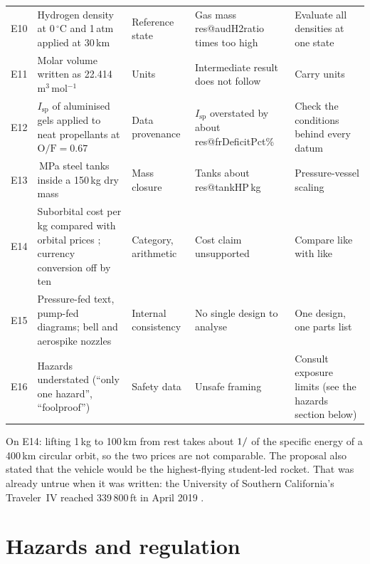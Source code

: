 \documentclass[11pt,a4paper]{article}
\makeatletter
\newcommand{\R}[1]{\csname res@#1\endcsname}
\newcommand{\Isp}{I_{\mathrm{sp}}}
\makeatother
\begin{document}
\begin{table}[p]
\begin{tabular}{@{}l>{\raggedright\arraybackslash}p{5.0cm}>{\raggedright\arraybackslash}p{2.0cm}>{\raggedright\arraybackslash}p{3.6cm}>{\raggedright\arraybackslash}p{3.2cm}@{}}
E10 & Hydrogen density at 0\,$^\circ$C and 1\,atm applied at 30\,km & Reference state & Gas mass \R{audH2ratio} times too high & Evaluate all densities at one state \\
E11 & Molar volume written as 22.414\,m$^3$\,mol$^{-1}$ & Units & Intermediate result does not follow & Carry units \\
E12 & $\Isp$ of aluminised gels applied to neat propellants at $\mathrm{O/F}=0.67$ & Data provenance & $\Isp$ overstated by about \R{frDeficitPct}\% & Check the conditions behind every datum \\
E13 & 20.7\,MPa steel tanks inside a 150\,kg dry mass & Mass closure & Tanks about \R{tankHP}\,kg & Pressure-vessel scaling \\
E14 & Suborbital cost per kg compared with orbital prices \cite{jones2018}; currency conversion off by ten & Category, arithmetic & Cost claim unsupported & Compare like with like \\
E15 & Pressure-fed text, pump-fed diagrams; bell and aerospike nozzles & Internal consistency & No single design to analyse & One design, one parts list \\
E16 & Hazards understated (``only one hazard'', ``foolproof'') & Safety data & Unsafe framing & Consult exposure limits (see the hazards section below) \\
\bottomrule
\end{tabular}
\end{table}

On E14: lifting 1\,kg to 100\,km from rest takes about $1/\R{audEratio}$ of the specific energy of a 400\,km circular orbit, so the two prices are not comparable. The proposal also stated that the vehicle would be the highest-flying student-led rocket. That was already untrue when it was written: the University of Southern California's Traveler~IV reached 339\,800\,ft in April 2019 \cite{traveler}.

\section*{Hazards and regulation}
\end{document}

